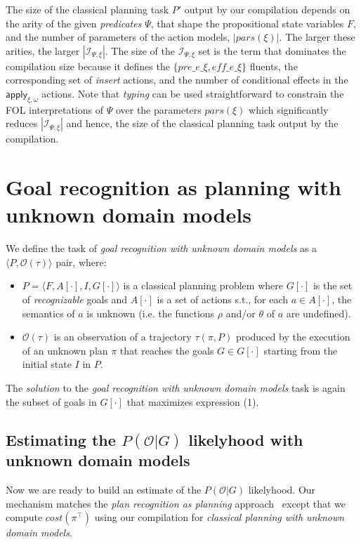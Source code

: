 \documentclass{article}
\newcommand{\tup}[1]{{\langle #1 \rangle}}
\begin{document}
The size of the classical planning task $P'$ output by our compilation depends on the arity of the given {\em predicates} $\Psi$, that shape the propositional state variables $F$, and the number of parameters of the action models, $|pars(\xi)|$. The larger these arities, the larger $|{\mathcal I}_{\Psi,\xi}|$. The size of the ${\mathcal I}_{\Psi,\xi}$ set is the term that dominates the compilation size because it defines the $\{pre\_e\_\xi, eff\_e\_\xi\}$ fluents, the corresponding set of {\em insert} actions, and the number of conditional effects in the $\mathsf{apply_{\xi,\omega}}$ actions. Note that {\em typing} can be used straightforward to constrain the FOL interpretations of $\Psi$ over the parameters $pars(\xi)$ which significantly reduces $|{\mathcal I}_{\Psi,\xi}|$ and hence, the size of the classical planning task output by the compilation.



\section{Goal recognition as planning with unknown domain models}
\label{sec:recognition}

We define the task of {\em goal recognition with unknown domain models} as a $\tup{P,\mathcal{O}(\tau)}$ pair, where:
\begin{itemize}
\item $P=\tup{F,A[\cdot],I,G[\cdot]}$ is a classical planning problem where $G[\cdot]$ is the set of {\em recognizable} goals and $A[\cdot]$ is a set of actions s.t., for each $a\in A[\cdot]$, the semantics of $a$ is unknown (i.e. the functions $\rho$ and/or $\theta$ of $a$ are undefined).
\item $\mathcal{O}(\tau)$ is an observation of a trajectory $\tau(\pi,P)$ produced by the execution of an unknown plan $\pi$ that reaches the goals $G\in G[\cdot]$ starting from the initial state $I$ in $P$.
\end{itemize}

The {\em solution} to the {\em goal recognition with unknown domain models} task is again the subset of goals in $G[\cdot]$ that maximizes expression (1). 

\subsection{Estimating the $P(\mathcal{O}|G)$ likelyhood with unknown domain models}
Now we are ready to build an estimate of the $P(\mathcal{O}|G)$ likelyhood. Our mechanism matches the {\em plan recognition as planning} approach~\cite{ramirez2012plan} except that we compute $cost(\pi^\top)$ using our compilation for {\em classical planning with unknown domain models}.
\end{document}
